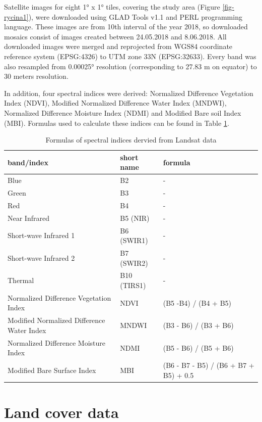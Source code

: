 \documentclass{amuthesis}
\begin{document}
Satellite images for eight 1° x 1° tiles, covering the study area
(Figure \ref{fig-rycina1}), were downloaded using GLAD Tools v1.1 and
PERL programming language. These images are from 10th interval of the
year 2018, so downloaded mosaics consist of images created between
24.05.2018 and 8.06.2018. All downloaded images were merged and
reprojected from WGS84 coordinate reference system (EPSG:4326) to UTM
zone 33N (EPSG:32633). Every band was also resampled from 0.00025°
resolution (corresponding to 27.83 m on equator) to 30 meters
resolution.

In addition, four spectral indices were derived: Normalized Difference
Vegetation Index (NDVI), Modified Normalized Difference Water Index
(MNDWI), Normalized Difference Moisture Index (NDMI) and Modified Bare
soil Index (MBI). Formulas used to calculate these indices can be found
in Table \ref{tbl-tabela1}.

\hypertarget{tbl-tabela1}{}
\begin{table}
\caption{\label{tbl-tabela1}Formulas of spectral indices dervied from Landsat data }\tabularnewline

\centering
\begin{tabular}{|>{}l|>{}l|>{}l|}
\toprule
\textbf{band/index} & \textbf{short name} & \textbf{formula}\\
\midrule
Blue & B2 & -\\
\hline
Green & B3 & -\\
\hline
Red & B4 & -\\
\hline
Near Infrared & B5 (NIR) & -\\
\hline
Short-wave Infrared 1 & B6 (SWIR1) & -\\
\hline
Short-wave Infrared 2 & B7 (SWIR2) & -\\
\hline
Thermal & B10 (TIRS1) & -\\
\hline
Normalized Difference Vegetation Index & NDVI & (B5 -B4) / (B4 + B5)\\
\hline
Modified Normalized Difference Water Index & MNDWI & (B3 - B6) / (B3 + B6)\\
\hline
Normalized Difference Moisture Index & NDMI & (B5 - B6) / (B5 + B6)\\
\hline
Modified Bare Surface Index & MBI & (B6 - B7 - B5) / (B6 + B7 + B5) + 0.5\\
\bottomrule
\end{tabular}
\end{table}

\hypertarget{sec-landcover}{%
\section{Land cover data}\label{sec-landcover}}
\end{document}
